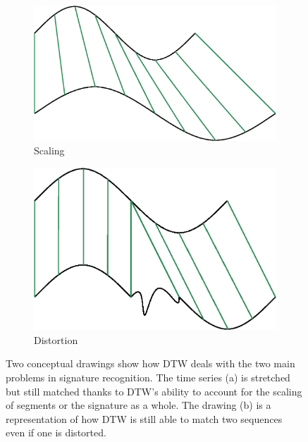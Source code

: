 \documentclass[a4paper, oneside]{csthesis}
\begin{document}
\begin{figure}
        \centering
        \begin{subfigure}[b]{0.30\textwidth}
                \centering
                \includegraphics[width=\textwidth]{figures/dtw-stretch.eps}
                \caption{Scaling}
                \label{fig:hmm1}
        \end{subfigure}%
        \quad
        \begin{subfigure}[b]{0.30\textwidth}
                \centering
                \includegraphics[width=\textwidth]{figures/dtw-distort.eps}
                \caption{Distortion}
                \label{fig:hmm1}
        \end{subfigure}%

        \caption{Two conceptual drawings show how DTW deals with the two main problems in signature recognition. The time series (a) is stretched but still matched thanks to DTW's ability to account for the scaling of segments or the signature as a whole. The drawing (b) is a representation of how DTW is still able to match two sequences even if one is distorted.}
        \label{fig:dtw-model}
\end{figure}
\end{document}
